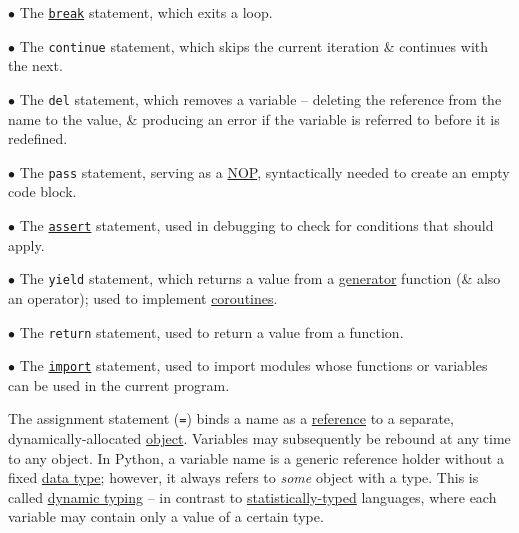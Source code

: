 \documentclass{article}
\numberwithin{equation}{section}
\begin{document}
\begin{enumerate*}
	\item[$\bullet$] The \href{https://en.wikipedia.org/wiki/Break_statement}{\texttt{break}} statement, which exits a loop.
	\item[$\bullet$] The \texttt{continue} statement, which skips the current iteration \& continues with the next.
	\item[$\bullet$] The \texttt{del} statement, which removes a variable -- deleting the reference from the name to the value, \& producing an error if the variable is referred to before it is redefined.
	\item[$\bullet$] The \texttt{pass} statement, serving as a \href{https://en.wikipedia.org/wiki/NOP_(code)}{NOP}, syntactically needed to create an empty code block.
	\item[$\bullet$] The \href{https://en.wikipedia.org/wiki/Assertion_(programming)}{\texttt{assert}} statement, used in debugging to check for conditions that should apply.
	\item[$\bullet$] The \texttt{yield} statement, which returns a value from a \href{https://en.wikipedia.org/wiki/Generator_(computer_programming)#Python}{generator} function (\& also an operator); used to implement \href{https://en.wikipedia.org/wiki/Coroutine}{coroutines}.
	\item[$\bullet$] The \texttt{return} statement, used to return a value from a function.
	\item[$\bullet$] The \href{https://en.wikipedia.org/wiki/Include_directive}{\texttt{import}} statement, used to import modules whose functions or variables can be used in the current program.
\end{enumerate*}

The assignment statement (\texttt{=}) binds a name as a \href{https://en.wikipedia.org/wiki/Pointer_(computer_programming)}{reference} to a separate, dynamically-allocated \href{https://en.wikipedia.org/wiki/Object_(computer_science)}{object}. Variables may subsequently be rebound at any time to any object. In Python, a variable name is a generic reference holder without a fixed \href{https://en.wikipedia.org/wiki/Type_system}{data type}; however, it always refers to \textit{some} object with a type. This is called \href{https://en.wikipedia.org/wiki/Dynamic_type}{dynamic typing} -- in contrast to \href{https://en.wikipedia.org/wiki/Statically-typed}{statistically-typed} languages, where each variable may contain only a value of a certain type.
\end{document}
